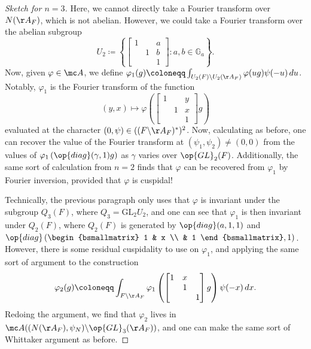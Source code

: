 \documentclass[../notes.tex]{subfiles}
\begin{document}
\begin{proof}[Sketch for $n=3$]
	Here, we cannot directly take a Fourier transform over $N(\AA_F)$, which is not abelian. However, we could take a Fourier transform over the abelian subgroup
	\[U_2\coloneqq\left\{\begin{bmatrix}
		1 & & a \\ & 1 & b \\ && 1
	\end{bmatrix}:a,b\in\mathbb G_a\right\}.\]
	Now, given $\varphi\in\mc A$, we define $\varphi_1(g)\coloneqq\int_{U_2(F)\backslash U_2(\AA_F)}\varphi(ug)\psi(-u)\,du$. Notably, $\varphi_1$ is the Fourier transform of the function
	\[(y,x)\mapsto\varphi\left(\begin{bmatrix}
		1 && y \\ & 1 & x \\ && 1
	\end{bmatrix}g\right)\]
	evaluated at the character $(0,\psi)\in((F\backslash\AA_F)^*)^2$. Now, calculating as before, one can recover the value of the Fourier transform at $(\psi_1,\psi_2)\ne(0,0)$ from the values of $\varphi_1\left(\op{diag}(\gamma,1)g\right)$ as $\gamma$ varies over $\op{GL}_2(F)$. Additionally, the same sort of calculation from $n=2$ finds that $\varphi$ can be recovered from $\varphi_1$ by Fourier inversion, provided that $\varphi$ is cuspidal!

	Technically, the previous paragraph only uses that $\varphi$ is invariant under the subgroup $Q_3(F)$, where $Q_3=\mathrm{GL}_2U_2$, and one can see that $\varphi_1$ is then invariant under $Q_2(F)$, where $Q_2(F)$ is generated by $\op{diag}(a,1,1)$ and $\op{diag}\left(\begin{bsmallmatrix}
		1 & x \\ & 1
	\end{bsmallmatrix},1\right)$. However, there is some residual cuspidality to use on $\varphi_1$, and applying the same sort of argument to the construction
	\[\varphi_2(g)\coloneqq\int_{F\backslash\AA_F}\varphi_1\left(\begin{bmatrix}
		1 & x \\ & 1 \\ && 1
	\end{bmatrix}g\right)\psi(-x)\,dx.\]
	Redoing the argument, we find that $\varphi_2$ lives in $\mc A((N(\AA_F),\psi_N)\backslash\op{GL}_3(\AA_F))$, and one can make the same sort of Whittaker argument as before.
\end{proof}
\end{document}
